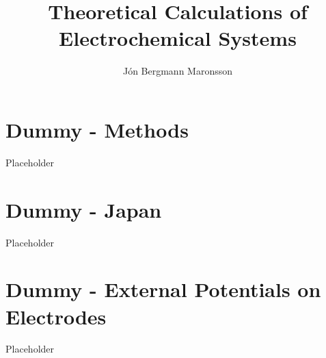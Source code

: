 \documentclass[a4paper, 12pt, oneside]{bThesis} %
\author{J\'on Bergmann Maronsson}
\title{Theoretical Calculations of Electrochemical Systems}
\begin{document}
%

%
\chapter{Dummy - Methods}
\label{ch:methods}
Placeholder
%
\chapter{Dummy - Japan}
\label{ch:japan}
Placeholder
%
\chapter{Dummy - External Potentials on Electrodes}
\label{ch:dacapo}
Placeholder



\newpage
{}

\end{document}
